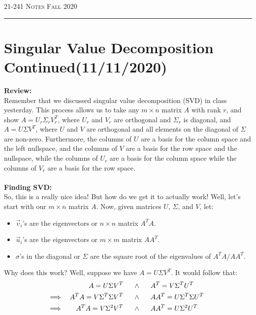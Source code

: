 \documentclass[12pt]{amsart}
\begin{document}
\thispagestyle{empty}

{\scshape 21-241} \hfill {\scshape \Large Notes} \hfill {\scshape Fall 2020}
\medskip
\hrule
\bigskip

\section*{Singular Value Decomposition Continued(11/11/2020)}
\textbf{Review:}\\
Remember that we discussed singular value decomposition (SVD) in class yesterday. This process allows us to take any $m \times n$ matrix $A$ with rank $r$, and show $A=U_r\Sigma_rV^T_r$, where $U_r$ and $V_r$ are orthogonal and $\Sigma_r$ is diagonal, and $A=U\Sigma V^T$, where $U$ and $V$ are orthogonal and all elements on the diagonal of $\Sigma$ are non-zero. Furthermore, the columns of $U$ are a basis for the column space and the left nullspace, and the columns of $V$ are a basis for the row space and the nullspace, while the columns of $U_r$ are a basis for the column space while the columns of $V_r$ are a basis for the row space.\\
\\
\textbf{Finding SVD:}\\
So, this is a really nice idea! But how do we get it to actually work! Well, let's start with our $m \times n$ matrix $A$. Now, given matrices $U$, $\Sigma$, and $V$, let:
\begin{itemize}
	\item $\vec{v}_i$'s are the eigenvectors or $n \times n$ matrix $A^TA$.
	\item $\vec{u}_i$'s are the eigenvectors or $m \times m$ matrix $AA^T$.
	\item $\sigma$'s in the diagonal or $\Sigma$ are the square root of the eigenvalues of $A^TA$/$AA^T$.
\end{itemize}
Why does this work? Well, suppose we have $A = U\Sigma V^T$. It would follow that:
\begin{align*}
	&&A = U\Sigma V^T \hspace{5mm}&\land\hspace{5mm}A^T = V\Sigma^TU^T\\
	\implies&& A^TA = V\Sigma^T\Sigma V^T\hspace{5mm}&\land\hspace{5mm}AA^T = U\Sigma^T\Sigma U^T\\
	\implies&& A^TA = V\Sigma^2 V^T\hspace{5mm}&\land\hspace{5mm}AA^T = U\Sigma^2 U^T\hspace{5mm}
\end{align*}
\end{document}
